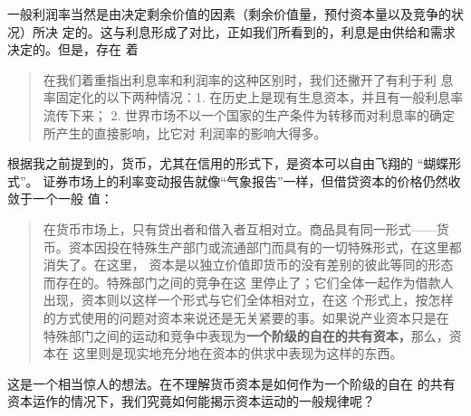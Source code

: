 一般利润率当然是由决定剩余价值的因素（剩余价值量，预付资本量以及竞争的状况）所决
定的。这与利息形成了对比，正如我们所看到的，利息是由供给和需求决定的。但是，存在
着

\begin{quotation}在我们着重指出利息率和利润率的这种区别时，我们还撇开了有利于利
息率固定化的以下两种情况：1. 在历史上是现有生息资本，并且有一般利息率流传下来；
2. 世界市场不以一个国家的生产条件为转移而对利息率的确定所产生的直接影响，比它对
利润率的影响大得多。

\end{quotation}

根据我之前提到的，货币，尤其在信用的形式下，是资本可以自由飞翔的 “蝴蝶形式”。
证券市场上的利率变动报告就像“气象报告”一样，但借贷资本的价格仍然收敛于一个一般
值：
\begin{quotation}在货币市场上，只有贷出者和借入者互相对立。商品具有同一形式——货
币。资本因投在特殊生产部门或流通部门而具有的一切特殊形式，在这里都消失了。在这里，
资本是以独立价值即货币的没有差别的彼此等同的形态而存在的。特殊部门之间的竞争在这
里停止了；它们全体一起作为借款人出现，资本则以这样一个形式与它们全体相对立，在这
个形式上，按怎样的方式使用的问题对资本来说还是无关紧要的事。如果说产业资本只是在
特殊部门之间的运动和竞争中表现为\textbf{一个阶级的自在的共有资本，}那么，资本在
这里则是现实地充分地在资本的供求中表现为这样的东西。

\end{quotation}这是一个相当惊人的想法。在不理解货币资本是如何作为一个阶级的自在
的共有资本运作的情况下，我们究竟如何能揭示资本运动的一般规律呢？

